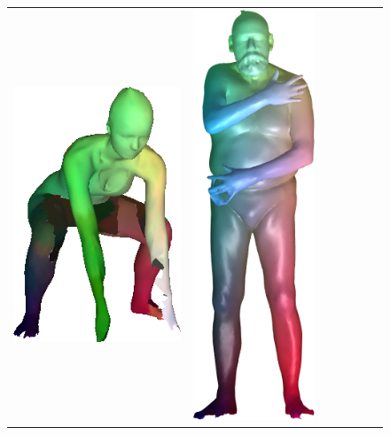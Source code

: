 \begin{figure}[b!]
\begin{tabular}[width=0.8\textwidth]{c|cc|cc|cc|}
		\includegraphics[scale=0.25]{figures/target00.png} &
		\includegraphics[scale=0.38]{figures/test_scan_051_bas.png}&

\end{tabular}
\end{figure}
